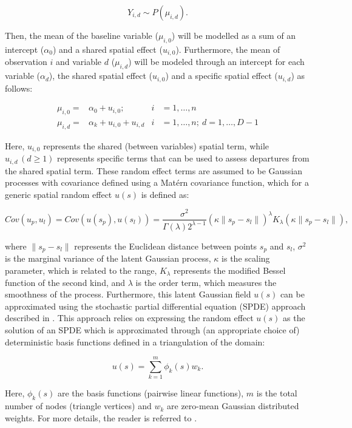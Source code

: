 $$
Y_{i,d} \sim P(\mu_{i,d}) .
$$

Then, the mean of the baseline variable ($\mu_{i,0}$) will be modelled as a sum of an intercept ($\alpha_0$) and a shared spatial effect ($u_{i,0}$). Furthermore, the mean of observation $i$ and variable $d$ ($\mu_{i,d}$) will be modeled through an intercept for each variable ($\alpha_d$), the shared spatial effect ($u_{i,0}$) and a specific spatial effect ($u_{i,d}$) as follows:

\begin{align}
\mu_{i,0} =& \alpha_0 + u_{i,0};  &i&=1,\ldots,n\nonumber\\
\mu_{i,d} =& \alpha_k + u_{i,0} + u_{i,d}  &i&=1,\ldots,n;\ d=1,\ldots,D-1\nonumber
\end{align}


\noindent
Here, $u_{i,0}$ represents the shared (between variables) spatial term, while  $u_{i,d}\, (d\geq1)$ represents specific terms that can be used to assess departures from the shared spatial term. These random effect terms are assumed to be Gaussian processes with covariance defined using a Matérn covariance function, which for a generic spatial random effect $u(s)$ is defined as:

$$
Cov(u_p, u_l) = Cov(u(s_p), u(s_l))= \frac{\sigma^2}{\Gamma(\lambda)2^{\lambda-1}} (\kappa \|s_p - s_l\|)^{\lambda}K_{\lambda}(\kappa \|s_p - s_l\|) ,
$$

\noindent
where $\|s_p - s_l\|$ represents the Euclidean distance between points $s_p$ and $s_l$, $\sigma^2$ is the marginal variance of the latent Gaussian process, $\kappa$ is the scaling parameter, which is related to the range, $K_{\lambda}$ represents the modified Bessel function of the second kind, and $\lambda$ is the order term, which measures the smoothness of the process. Furthermore, this latent Gaussian field $u(s)$ can be approximated using the stochastic partial differential equation (SPDE) approach described in \citet{SPDE}. This approach relies on expressing the random effect $u(s)$  as the solution of an SPDE which is approximated through (an appropriate choice of) deterministic basis functions defined in a triangulation of the domain:

$$
u(s) =\sum_{k=1}^{m} \phi_k(s) w_k .
$$

\noindent
Here, $\phi_k(s)$ are the basis functions (pairwise linear functions), $m$ is the total number of nodes (triangle vertices) and $w_k$ are zero-mean Gaussian distributed weights. For more details, the reader is referred to \citet{SPDE}.

